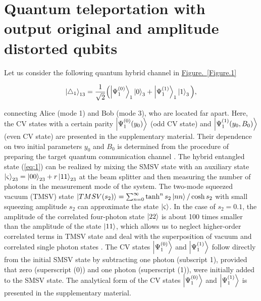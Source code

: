 \documentclass{optica-article}
\begin{document}
\section{Quantum teleportation with output original and amplitude distorted qubits}


Let us consider the following quantum hybrid channel in \hyperref[Figure.1]{Figure.~\ref*{Figure.1}} 

\begin{equation}\label{eq:1}
    \ket{\triangle_{1}}_{13} =
    \frac{1}{\sqrt{2}}\Bigl(
    \ket{\Psi_{1}^{(0)}}_1
    \ket{0}_3 +
    \ket{\Psi_{1}^{(1)}}_1
    \ket{1}_3\Bigl),
\end{equation}

\!\!\!\!\!\!connecting Alice (mode 1) and Bob (mode 3), who are located far apart. Here, the CV states with a certain parity $\ket{\Psi_{1}^{(0)}(y_0)}$ (odd CV state) and $\ket{\Psi_{1}^{(1)}(y_0,B_0)}$ (even CV state) are presented in the supplementary material. Their dependence on two initial parameters $y_0$ and $B_0$ is determined from the procedure of preparing the target quantum communication channel \cite{34}. 
The hybrid entangled state (\ref{eq:1}) can be realized by mixing the SMSV state with an auxiliary state $\ket{\varsigma}_{23} = \ket{00}_{23} + r\ket{11}_{23}$ at the beam splitter and then measuring the number of photons in the measurement mode of the system. The two-mode squeezed vacuum (TMSV) state $\ket{TMSV(s_2)} =
\sum_{n=0}^{\infty} \tanh^n s_2\ket{nn}/\cosh s_2$  \cite{42} with small squeezing amplitude $s_2$ can approximate the state $\ket{\varsigma}$. In the case of $s_2=0.1$, the amplitude of the correlated four-photon state $\ket{22}$ is about 100 times smaller than the amplitude of the state $\ket{11}$, which allows us to neglect higher-order correlated terms in TMSV state and deal with the superposition of vacuum and correlated single photon states \cite{42}. The CV states $\ket{\Psi_{1}^{(0)}}$  and $\ket{\Psi_{1}^{(1)}}$  follow directly from the initial SMSV state by subtracting one photon (subscript 1), provided that zero (superscript (0)) and one photon (superscript (1)), were initially added to the SMSV state. The analytical form of the CV states $\ket{\Psi_{1}^{(0)}}$  and $\ket{\Psi_{1}^{(1)}}$  is presented in the supplementary material.
\end{document}
